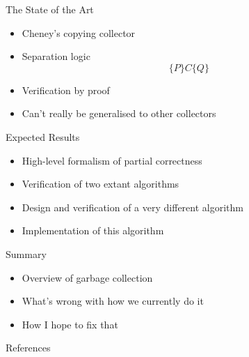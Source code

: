 \documentclass{beamer}
\begin{document}
\begin{frame}{The State of the Art}
  \begin{itemize}[<+->]
    \item \alert<1>{Cheney's copying collector\cite{Birkedal04}}
    \item \alert<2>{Separation logic}
      \[\{P\} C \{Q\}\]
    \item \alert<3>{Verification by proof}
    \item \alert<4>{Can't really be generalised to other collectors}
  \end{itemize}
\end{frame}

\begin{frame}{Expected Results}
  \begin{itemize}[<+->]
    \item \alert<1>{High-level formalism of partial correctness}
    \item \alert<2>{Verification of two extant algorithms}
    \item \alert<3>{Design and verification of a very different
        algorithm}
    \item \alert<4>{Implementation of this algorithm}
  \end{itemize}
\end{frame}

\begin{frame}{Summary}
  \begin{itemize}[<+->]
    \item \alert<1>{Overview of garbage collection}
    \item \alert<2>{What's wrong with how we currently do it}
    \item \alert<3>{How I hope to fix that}
  \end{itemize}
\end{frame}

\begin{frame}{References}
  
  
\end{frame}
\end{document}
